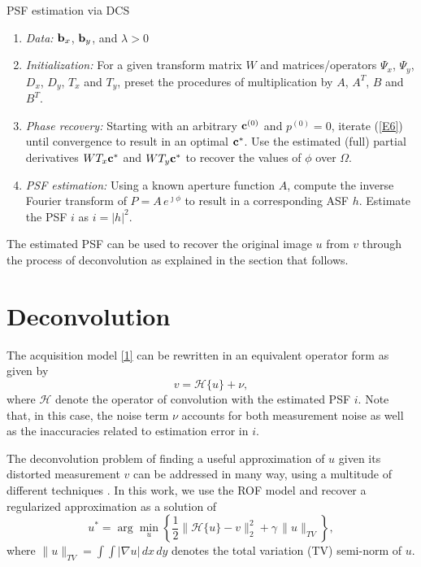 \pdfoutput=1 \documentclass[journal]{IEEEtran}
\newcommand{\cc}{{\bf c}}
\newcommand{\bbx}{{\bf b}_x}
\newcommand{\bby}{{\bf b}_y}
\begin{document}
\begin{algorithm}
\setlength{\leftmargini}{0pt}
\caption{PSF estimation via DCS}
\begin{enumerate}
\item {\it Data:} $\bbx$, $\bby$, and $\lambda > 0$
\item {\it Initialization:} For a given transform matrix $W$ and matrices/operators $\Psi_x$, $\Psi_y$, $D_x$, $D_y$, $T_x$ and $T_y$, preset the procedures of multiplication by $A$, $A^T$, $B$ and $B^T$.
\item {\it Phase recovery:} Starting with an arbitrary $\cc^{(0)}$ and $p^{(0)} = 0$, iterate (\ref{E6}) until convergence to result in an optimal $\cc^\ast$. Use the estimated (full) partial derivatives $W T_x \cc^\ast$ and $W T_y \cc^\ast$ to recover the values of $\phi$ over $\Omega$.
\item {\it PSF estimation:} Using a known aperture function $A$, compute the inverse Fourier transform of $P = A \, e^{\jmath \phi}$ to result in a corresponding ASF $h$. Estimate the PSF $i$ as $i = |h|^2$.
\end{enumerate}
\label{algo1}
\end{algorithm}

The estimated PSF can be used to recover the original image $u$ from $v$ through the process of deconvolution as explained in the section that follows.

\section{Deconvolution}
The acquisition model \eqref{1} can be rewritten in an equivalent operator form as given by
\begin{equation} \label{30}
v = \mathcal{H}\{u\}+\nu,
\end{equation}
where $\mathcal{H}$ denote the operator of convolution with the estimated PSF $i$. Note that, in this case, the noise term $\nu$ accounts for both measurement noise as well as the inaccuracies related to estimation error in $i$.

The deconvolution problem of finding a useful approximation of $u$ given its distorted measurement $v$ can be addressed in many way, using a multitude of different techniques \cite{31, 32, 33}. In this work, we use the ROF model and recover a regularized approximation as a solution of
\begin{equation} \label{E7}
u^\ast = \arg \min_u \left\{ \frac{1}{2} \| \mathcal{H}\{u\} -v \|_2^2 + \gamma \, \| u \|_{TV} \right\},
\end{equation}
where $\| u \|_{TV} = \int \int | \nabla  u | \, dx \, dy $ denotes the total variation (TV) semi-norm of $u$.
\end{document}
